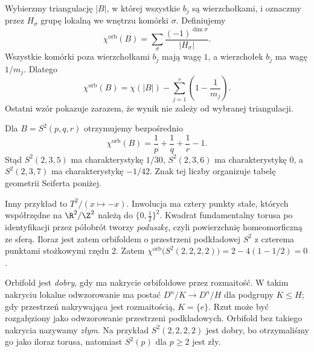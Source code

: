 \begin{definicja}
\label{def:thurston-chi-orb}
Wybierzmy triangulację $|B|$, w której wszystkie $b_j$ są
wierzchołkami, i oznaczmy przez $H_\sigma$ grupę lokalną
we wnętrzu komórki $\sigma$. Definiujemy
\[
 \chi^{\mathrm{orb}}(B)
 =\sum_{\sigma}\frac{(-1)^{\dim\sigma}}{|H_\sigma|}.
\]
Wszystkie komórki poza wierzchołkami $b_j$ mają wagę $1$,
a wierzchołek $b_j$ ma wagę $1/m_j$. Dlatego
\[
 \chi^{\mathrm{orb}}(B)
 =\chi(|B|)-\sum_{j=1}^r\left(1-\frac1{m_j}\right).
\]
Ostatni wzór pokazuje zarazem, że wynik nie zależy od
wybranej triangulacji.
\end{definicja}

\begin{przyklad}
\label{prz:thurston-chi-orb-znaki}
Dla $B=S^2(p,q,r)$ otrzymujemy bezpośrednio
\[
 \chi^{\mathrm{orb}}(B)=\frac1p+\frac1q+\frac1r-1.
\]
Stąd $S^2(2,3,5)$ ma charakterystykę $1/30$,
$S^2(2,3,6)$ ma charakterystykę $0$, a $S^2(2,3,7)$
ma charakterystykę $-1/42$. Znak tej liczby organizuje
tabelę geometrii Seiferta poniżej.

Inny przykład to $T^2/(x\mapsto-x)$. Inwolucja ma cztery
punkty stałe, których współrzędne na $\R^2/\Z^2$ należą do
$\{0,\tfrac12\}^2$. Kwadrat fundamentalny torusa po
identyfikacji przez półobrót tworzy \emph{poduszkę}, czyli
powierzchnię homeomorficzną ze sferą. Iloraz jest zatem
orbifoldem o przestrzeni podkładowej $S^2$ z czterema punktami
stożkowymi rzędu $2$. Zatem
$\chi^{\mathrm{orb}}\bigl(S^2(2,2,2,2)\bigr)
=2-4(1-1/2)=0$.
\end{przyklad}

\begin{definicja}
\label{def:thurston-orbifold-dobry}
Orbifold jest \emph{dobry}, gdy ma nakrycie orbifoldowe przez
rozmaitość. W takim nakryciu lokalne odwzorowanie ma postać
$D^n/K\to D^n/H$ dla podgrupy $K\leq H$; gdy przestrzeń
nakrywająca jest rozmaitością, $K=\{e\}$. Rzut może być
rozgałęziony jako odwzorowanie przestrzeni podkładowych.
Orbifold bez takiego nakrycia nazywamy \emph{złym}.
Na przykład $S^2(2,2,2,2)$ jest dobry, bo otrzymaliśmy go
jako iloraz torusa, natomiast $S^2(p)$ dla $p\geq2$ jest zły.
\end{definicja}


